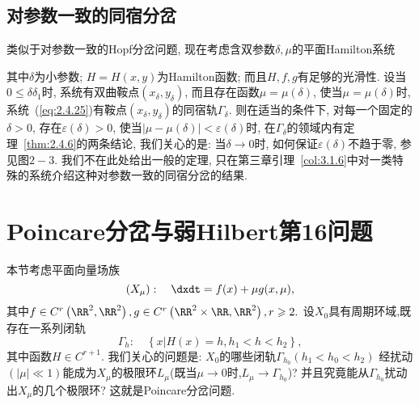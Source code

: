 \subsection{对参数一致的同宿分岔}
类似于对参数一致的Hopf分岔问题,
现在考虑含双参数$\delta,\mu$的平面Hamilton系统
\begin{ode}
  \label{eq:2.4.25}
  \dxdt=-+\delta f(x, y, \mu, \delta)} ,\\
\dydt=\frac{\partial H}{\partial x}+\delta g(x, y, \mu, \delta)},
\end{ode}

其中$\delta$为小参数;
$H=H(x,y)$为Hamilton函数;
而且$H,f,g$有足够的光滑性.
设当$0\leq \delta \delta_1$时,
系统有双曲鞍点$(x_{\delta},y_{\delta})$,
而且存在函数$\mu=\mu(\delta)$,
使当$\mu=\mu(\delta)$时,
系统~(\ref{eq:2.4.25})有鞍点$(x_{\delta},y_{\delta})$的同宿轨$\Gamma_{\delta}$.
则在适当的条件下,
对每一个固定的$\delta>0$,
存在$\varepsilon(\delta)>0$,
使当$|\mu-\mu(\delta)|<\varepsilon(\delta)$时,
在$\Gamma_{\delta}$的领域内有定理~\ref{thm:2.4.6}的两条结论,
我们关心的是:
当$\delta \to 0$时,
如何保证$\varepsilon(\delta)$不趋于零,
参见图$2-3$.
我们不在此处给出一般的定理,
只在第三章引理~\ref{col:3.1.6}中对一类特殊的系统介绍这种对参数一致的同宿分岔的结果.

\section{Poincare分岔与弱Hilbert第16问题}
本节考虑平面向量场族
\begin{equation}
  \label{eq:2.5.1}
  \left(X_{\mu}\right): \quad \dxdt=f(x)+\mu g(x, \mu),
\end{equation}
其中$f \in C^{r}\left(\RR^{2}, \RR^{2}\right), g \in C^{r}\left(\RR^{2} \times \RR, \RR^{2}\right), r \geqslant 2.$
设$X_0$具有周期环域,既存在一系列闭轨
$$
\Gamma_{h}: \quad\left\{x | H(x)=h, h_{1}<h<h_{2}\right\},
$$
其中函数$H \in C^{r+1}.$
我们关心的问题是:
$X_0$的哪些闭轨$\Gamma_{h_{0}}\left(h_{1}<h_0<h_2\right)$
经扰动$(|\mu| \ll 1)$能成为$X_{\mu}$的极限环$L_{\mu}$(既当$\mu \to 0$时,$L_{\mu} \to \Gamma_{h_0}$)?
并且究竟能从$\Gamma_{h_0}$扰动出$X_{\mu}$的几个极限环?
这就是Poincare分岔问题.

